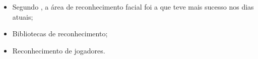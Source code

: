 \begin{itemize}
    \item<1> Segundo , a área de reconhecimento facial foi a que teve mais sucesso nos dias atuais;
    \item<1> Bibliotecas de reconhecimento;
    \item<1> Reconhecimento de jogadores.
\end{itemize}